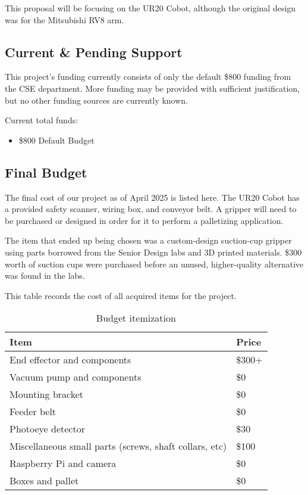 This proposal will be focusing on the UR20 Cobot, although the original design was for the Mitsubishi RV8 arm.

\subsection{Current \& Pending Support}
This project's funding currently consists of only the default \$800 funding from the CSE department. More funding may be provided with sufficient justification, but no other funding sources are currently known.

    Current total funds:
    \begin{itemize}
        \item \$800 Default Budget
    \end{itemize}

\subsection{Final Budget}
The final cost of our project as of April 2025 is listed here.
The UR20 Cobot has a provided safety scanner, wiring box, and conveyor belt. A gripper will need to be purchased or designed in order for it to perform a palletizing application.

The item that ended up being chosen was a custom-design suction-cup gripper using parts borrowed from the Senior Design labs and 3D printed materials. \$300 worth of suction cups were purchased before an unused, higher-quality alternative was found in the labs.  


This table records the cost of all acquired items for the project.
\begin{table}[H]
\centering
    \caption{Budget itemization}
    \begin{tabular}{|l|l|}
        \hline
        \textbf{Item} & \textbf{Price} \\ \hline
        End effector and components & \$300+ \\ \hline
        Vacuum pump  and components & \$0 \\ \hline
        Mounting bracket & \$0\\ \hline
        Feeder belt & \$0 \\ \hline
        Photoeye detector & \$30 \\ \hline
        Miscellaneous small parts (screws, shaft collars, etc) & \$100 \\ \hline
        Raspberry Pi and camera & \$0 \\ \hline
        Boxes and pallet & \$0 \\ \hline
    \end{tabular}
\end{table}

